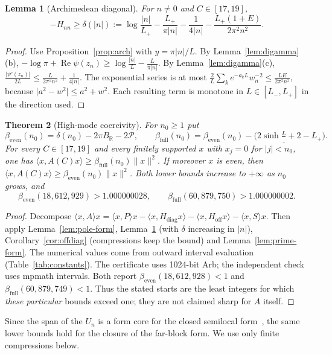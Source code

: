 \documentclass[11pt,a4paper]{article}
\newtheorem{theorem}{Theorem}[section]
\newtheorem{lemma}[theorem]{Lemma}
\theoremstyle{definition}
\newcommand{\R}{\mathbb{R}}
\newcommand{\ip}[2]{\langle #1,#2\rangle}
\newcommand{\norm}[1]{\lVert #1\rVert}
\newcommand{\abs}[1]{\lvert #1\rvert}
\newcommand{\Lmin}{L_{-}}
\newcommand{\Lmax}{L_{+}}
\DeclareMathOperator{\Rea}{Re}
\begin{document}
\begin{lemma}[Archimedean diagonal]\label{lem:arch-diag}
For $n\ne0$ and $C\in[17,19]$,
\[
-H_{nn}\ge\delta(\abs n):=\log\frac{\abs n}{\Lmax}-\frac{\Lmax}{\pi\abs n}-\frac1{4\abs n}-\frac{\Lmax(1+E)}{2\pi^2n^2}.
\]
\end{lemma}

\begin{proof}
Use Proposition~\ref{prop:arch} with $y=\pi\abs n/L$. By
Lemma~\ref{lem:digamma}(b), $-\log\pi+\Rea\psi(z_n)\ge\log\frac{\abs n}L-\frac L{\pi\abs n}$.
By Lemma~\ref{lem:digamma}(c),
$\frac{\abs{\psi'(z_n)}}{2L}\le\frac L{2\pi^2n^2}+\frac1{4\abs n}$. The
exponential series is at most
$\frac2L\sum_ke^{-a_kL}w_n^{-2}\le\frac{LE}{2\pi^2n^2}$, because
$\abs{a^2-w^2}\le a^2+w^2$. Each resulting term is monotone in
$L\in[\Lmin,\Lmax]$ in the direction used.
\end{proof}

\begin{theorem}[High-mode coercivity]\label{thm:coercive}
For $n_0\ge1$ put
\[
\beta_{\mathrm{even}}(n_0)=\delta(n_0)-2\pi B_\R-2\mathcal P,\qquad
\beta_{\mathrm{full}}(n_0)=\beta_{\mathrm{even}}(n_0)-\bigl(2\sinh\tfrac\Lmax2-\Lmax\bigr).
\]
For every $C\in[17,19]$ and every finitely supported $x$ with $x_j=0$ for
$\abs j<n_0$, one has $\ip x{A(C)x}\ge\beta_{\mathrm{full}}(n_0)\norm x^2$.
If moreover $x$ is even, then $\ip x{A(C)x}\ge\beta_{\mathrm{even}}(n_0)\norm x^2$.
Both lower bounds increase to $+\infty$ as $n_0$ grows, and
\[
\beta_{\mathrm{even}}(18{,}612{,}929)>1.000000028,\qquad
\beta_{\mathrm{full}}(60{,}879{,}750)>1.000000002.
\]
\end{theorem}

\begin{proof}
Decompose $\ip xAx=\ip xPx-\ip x{H_{\mathrm{diag}}x}-\ip x{H_{\mathrm{off}}x}-\ip xSx$.
Then apply Lemma~\ref{lem:pole-form}, Lemma~\ref{lem:arch-diag} (with $\delta$
increasing in $\abs n$), Corollary~\ref{cor:offdiag} (compressions keep the
bound) and Lemma~\ref{lem:prime-form}. The numerical values come from
outward interval evaluation (Table~\ref{tab:constants}). The certificate
uses 1024-bit Arb; the independent check uses mpmath intervals. Both report
$\beta_{\mathrm{even}}(18{,}612{,}928)<1$ and $\beta_{\mathrm{full}}(60{,}879{,}749)<1$.
Thus the stated starts are the least integers for which \emph{these
particular} bounds exceed one; they are not claimed sharp for $A$ itself.
\end{proof}

Since the span of the $U_n$ is a form core for the closed semilocal
form~\cite[Prop.~3.4]{CCM2025}, the same lower bounds hold for the closure
of the far-block form. We use only finite compressions below.
\end{document}
